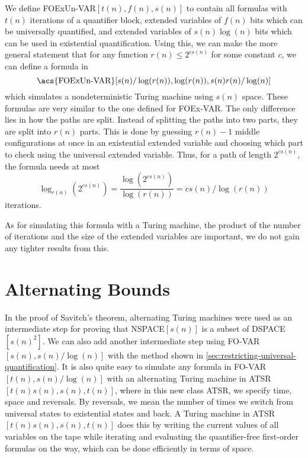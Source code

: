 We define \acs{FOExUn-VAR}$[t(n), f(n), s(n)]$ to contain all formulas with $t(n)$ iterations of a quantifier block, extended variables of $f(n)$ bits which can be universally quantified, and extended variables of $s(n)\log(n)$ bits which can be used in existential quantification.
Using this, we can make the more general statement that for any function $r(n) \leq 2^{cs(n)}$ for some constant $c$, we can define a formula in \[\text{\acs{FOExUn-VAR}$[s(n)/\log(r(n)), \log(r(n)), s(n)r(n)/\log(n)]$}\] which simulates a nondeterministic Turing machine using $s(n)$ space.
These formulas are very similar to the one defined for \acs{FOEx-VAR}\@.
The only difference lies in how the paths are split.
Instead of splitting the paths into two parts, they are split into $r(n)$ parts.
This is done by guessing $r(n) - 1$ middle configurations at once in an existential extended variable and choosing which part to check using the universal extended variable.
Thus, for a path of length $2^{cs(n)}$, the formula needs at most \[\log_{r(n)}\left(2^{cs(n)}\right) = \frac{\log\left(2^{cs(n)}\right)}{\log(r(n))} = cs(n)/\log(r(n))\] iterations.

As for simulating this formula with a Turing machine, the product of the number of iterations and the size of the extended variables are important, we do not gain any tighter results from this.


\section{Alternating Bounds}\label{sec:alternating-bounds}

In the proof of Savitch's theorem, alternating Turing machines were used as an intermediate step for proving that \acs{NSPACE}$[s(n)]$ is a subset of \acs{DSPACE}$[s(n)^2]$.
We can also add another intermediate step using \acs{FO-VAR}$[s(n), s(n)/\log(n)]$ with the method shown in \cref{sec:restricting-universal-quantification}.
It is also quite easy to simulate any formula in \acs{FO-VAR}$[t(n), s(n)/\log(n)]$ with an alternating Turing machine in \acs{ATSR}$[t(n)s(n), s(n), t(n)]$, where in this new class \acs{ATSR}, we specify time, space and reversals.
By reversals, we mean the number of times we switch from universal states to existential states and back.
A Turing machine in \acs{ATSR}$[t(n)s(n), s(n), t(n)]$ does this by writing the current values of all variables on the tape while iterating and evaluating the quantifier-free first-order formulas on the way, which can be done efficiently in terms of space.

